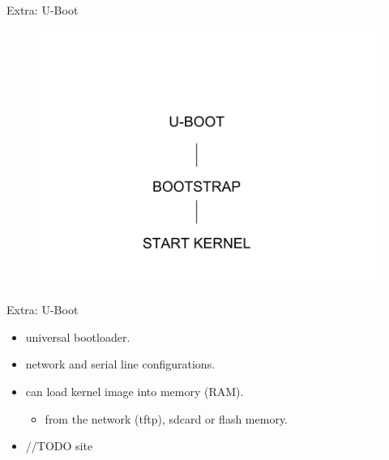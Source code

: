 \documentclass{workshop}
\begin{document}
\begin{frame}{Extra: U-Boot}
      \begin{figure}
         \includegraphics[scale=0.3]{img/u-boot.png}
      \end{figure}
\end{frame}

\begin{frame}{Extra: U-Boot}
\begin{itemize}
\item universal bootloader.
\item network and serial line configurations.
\item can load kernel image into memory (RAM).
  \begin{itemize}
  \item from the network (tftp), sdcard or flash memory.
  \end{itemize}
\item //TODO site
\end{itemize}
\end{frame}
\end{document}
